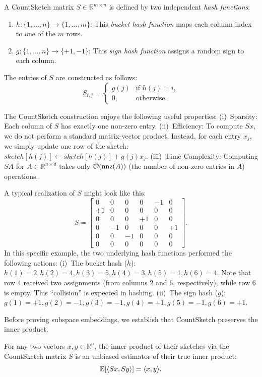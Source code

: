 A CountSketch matrix $S \in \mathbb{R}^{m \times n}$ is defined by two independent {\em hash functions}:
\begin{enumerate}
\item $h: \{1, \dots, n\} \to \{1, \dots, m\}$: This {\em bucket hash function} maps each column index to one of the $m$ rows.
\item $g: \{1, \dots, n\} \to \{+1, -1\}$: This {\em sign hash function} assigns a random sign to each column.
\end{enumerate}

The entries of $S$ are constructed as follows:
$$S_{i,j} = \begin{cases} g(j) & \text{if } h(j) = i, \\ 0, & \text{otherwise}. \end{cases}$$

The CountSketch construction enjoys the following useful properties: (i)~Sparsity: Each column of $S$ has exactly one non-zero entry. (ii)~Efficiency: To compute $Sx$, we do not perform a standard matrix-vector product. Instead, for each entry $x_j$, we simply update one row of the sketch: $sketch[h(j)] \leftarrow sketch[h(j)] + g(j)x_j$. (iii)~Time Complexity: Computing $SA$ for $A \in \mathbb{R}^{n \times d}$ takes only $\mathcal{O}(\text{nnz}(A))$ (the number of non-zero entries in $A$) operations.

A typical realization of $S$ might look like this:
$$S = \begin{bmatrix} 0 & 0 & 0 & 0 & -1 & 0 \\ +1 & 0 & 0 & 0 & 0 & 0 \\ 0 & 0 & 0 & +1 & 0 & 0 \\ 0 & -1 & 0 & 0 & 0 & +1 \\ 0 & 0 & -1 & 0 & 0 & 0 \\ 0 & 0 & 0 & 0 & 0 & 0 \end{bmatrix}.$$
In this specific example, the two underlying hash functions performed the following actions:
(i)~The bucket hash ($h$):
$h(1)=2, h(2)=4, h(3)=5, h(4)=3, h(5)=1, h(6)=4$.
Note that row 4 received two assignments (from columns 2 and 6, respectively), while row 6 is empty. This ``collision'' is expected in hashing. (ii)~The sign hash ($g$):
$g(1)=+1, g(2)=-1, g(3)=-1, g(4)=+1, g(5)=-1, g(6)=+1$.


Before proving subspace embeddings, we establish that CountSketch preserves the inner product.

\begin{lemma}\label{le:countsketchinner}
For any two vectors $x, y \in \mathbb{R}^n$, the inner product of their sketches via the CountSketch matrix $S$ is an unbiased estimator of their true inner product:
$$\mathbb{E}[\langle Sx, Sy \rangle] = \langle x, y \rangle.$$
\end{lemma}


